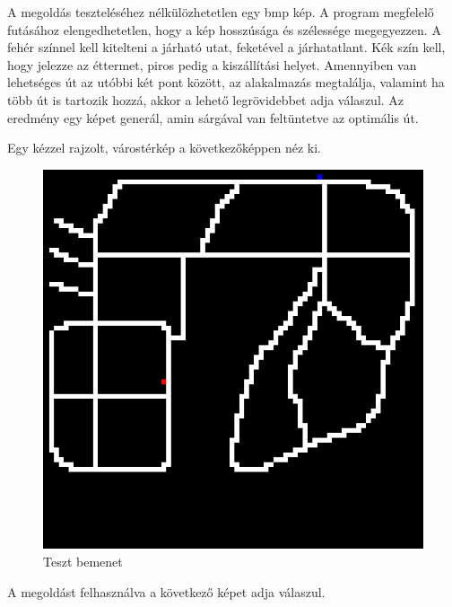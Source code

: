 
A megoldás teszteléséhez nélkülözhetetlen egy bmp kép. A program megfelelő futásához elengedhetetlen, hogy a kép hosszúsága és szélessége megegyezzen. A fehér színnel kell kitelteni a járható utat, feketével a járhatatlant. Kék szín kell, hogy jelezze az éttermet, piros pedig a kiszállítási helyet. Amennyiben van lehetséges út az utóbbi két pont között, az alakalmazás megtalálja, valamint ha több út is tartozik hozzá, akkor a lehető legrövidebbet adja válaszul. Az eredmény egy képet generál, amin sárgával van feltüntetve az optimális út.

Egy kézzel rajzolt, várostérkép a következőképpen néz ki.

\begin{figure}[h!]
\centering
\includegraphics[scale=0.6]{images/AStarProblem.jpg}
\caption{Teszt bemenet}
\label{fig:model1problem}
\end{figure}

A megoldást felhasználva a következő képet adja válaszul.

